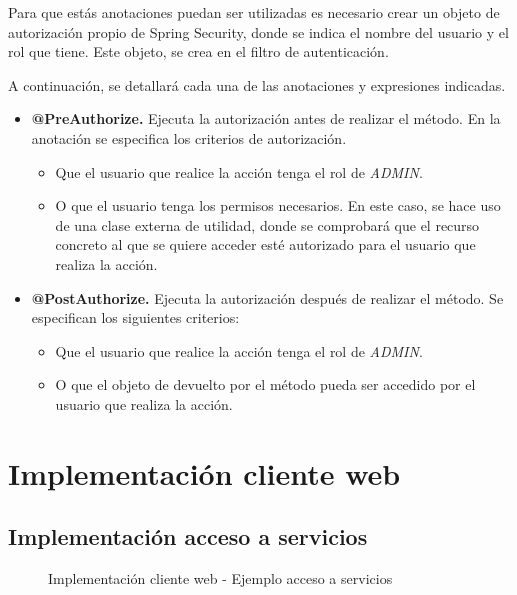 Para que estás anotaciones puedan ser utilizadas es necesario crear un objeto de autorización propio de Spring Security, donde se indica el nombre del usuario y el rol que tiene. Este objeto, se crea en el filtro de autenticación.

A continuación, se detallará cada una de las anotaciones y expresiones indicadas.

\begin{itemize}
	\item \textbf{@PreAuthorize. }Ejecuta la autorización antes de realizar el método. En la anotación se especifica los criterios de autorización.
	\begin{itemize}
		\item Que el usuario que realice la acción tenga el rol de \textit{ADMIN}.
		\item O que el usuario tenga los permisos necesarios. En este caso, se hace uso de una clase externa de utilidad, donde se comprobará que el recurso concreto al que se quiere acceder esté autorizado para el usuario que realiza la acción.
	\end{itemize}	 
		
	\item \textbf{@PostAuthorize. }Ejecuta la autorización después de realizar el método. Se especifican los siguientes criterios:
	\begin{itemize}
		\item Que el usuario que realice la acción tenga el rol de \textit{ADMIN}.
		\item O que el objeto de devuelto por el método pueda ser accedido por el usuario que realiza la acción.
	\end{itemize}
\end{itemize}


\newpage
\section{Implementación cliente web}

\subsection{Implementación acceso a servicios}

\begin{figure}[H]
\centering
{}
\caption{Implementación cliente web - Ejemplo acceso a servicios}
\end{figure}

